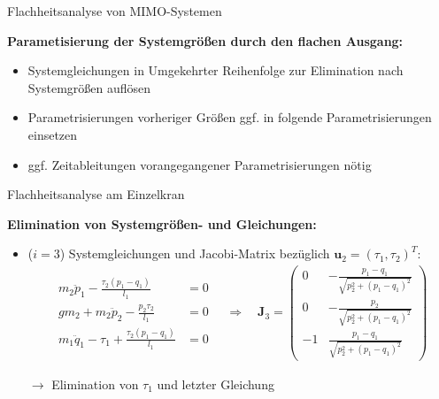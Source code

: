 \documentclass[
	ngerman,
	10pt,				%
	aspectratio=169 	%
]{beamer}
\begin{document}
\begin{frame}[t,fragile,label=Flachheit_5]{\large Flachheitsanalyse von MIMO-Systemen}
	
	\textbf{Parametisierung der Systemgrößen durch den flachen Ausgang:}
	
	\begin{itemize}
		\item Systemgleichungen in Umgekehrter Reihenfolge zur Elimination nach Systemgrößen auflösen
		\pause
		\item Parametrisierungen vorheriger Größen ggf. in folgende Parametrisierungen einsetzen
		\pause
		\item ggf. Zeitableitungen vorangegangener Parametrisierungen nötig
	\end{itemize}
	
\end{frame}


\begin{frame}[t,fragile,label=Flachheit_Einzelkran_1]{\large Flachheitsanalyse am Einzelkran}
	
	\textbf{Elimination von Systemgrößen- und Gleichungen:}
	
	\begin{itemize}
	\item {($i = 3$) Systemgleichungen und Jacobi-Matrix bezüglich $\mathbf{u}_2 = (\tau_1, \tau_2)^T$:}
	\begin{align*}
		\begin{split}
			m_{2} \ddot{p}_{1} - \frac{\tau_{2} \left(p_{1} - q_{1}\right)}{l_{1}} &= 0\\
			g m_{2} + m_{2} \ddot{p}_{2} - \frac{p_{2} \tau_{2}}{l_{1}} &= 0\\
			m_{1} \ddot{q}_{1} - \tau_{1} + \frac{\tau_{2} \left(p_{1} - q_{1}\right)}{l_{1}} &= 0
		\end{split}
		\quad \Rightarrow \quad 
		\mathbf{J}_3 = 
		\left(\begin{matrix}
			0 & - \frac{p_{1} - q_{1}}{\sqrt{p_{2}^{2} + \left(p_{1} - q_{1}\right)^{2}}}\\
			0 & - \frac{p_{2}}{\sqrt{p_{2}^{2} + \left(p_{1} - q_{1}\right)^{2}}}\\
			-1 & \frac{p_{1} - q_{1}}{\sqrt{p_{2}^{2} + \left(p_{1} - q_{1}\right)^{2}}}
		\end{matrix}\right)
	\end{align*}
	\pause
	\item[$\rightarrow$] Elimination von $\tau_1$ und letzter Gleichung	
	\end{itemize}
	
\end{frame}
\end{document}
